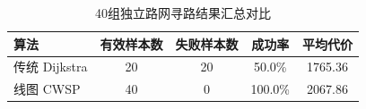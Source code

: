 \begin{table}[H]
	\centering
	\caption{40组独立路网寻路结果汇总对比}
	\label{tab:exp1_40cases_summary}
	\begin{tabular}{lcccc}
	\toprule
	算法 & 有效样本数 & 失败样本数 & 成功率 & 平均代价 \\
	\midrule
	传统 Dijkstra & 20 & 20 & 50.0\% & 1765.36 \\
	线图 CWSP & 40 & 0 & 100.0\% & 2067.86 \\
	\bottomrule
	\end{tabular}
\end{table}

